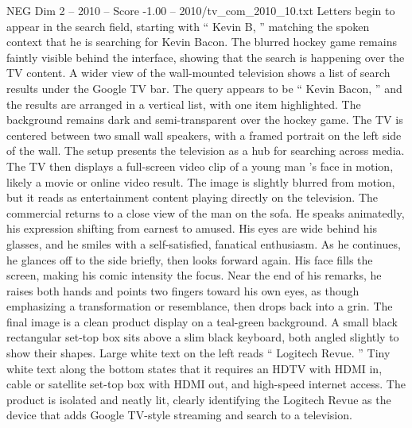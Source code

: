 \begin{textsample}{NEG Dim 2 – 2010 – Score -1.00 – 2010/tv\_com\_2010\_10.txt}
Letters begin to appear in the search field, starting with “ Kevin B, ” matching the spoken context that he is searching for Kevin Bacon.
The blurred hockey game remains faintly visible behind the interface, showing that the search is happening over the TV content.
A wider view of the wall-mounted television shows a list of search results under the Google TV bar.
The query appears to be “ Kevin Bacon, ” and the results are arranged in a vertical list, with one item highlighted.
The background remains dark and semi-transparent over the hockey game.
The TV is centered between two small wall speakers, with a framed portrait on the left side of the wall.
The setup presents the television as a hub for searching across media.
The TV then displays a full-screen video clip of a young man ’s face in motion, likely a movie or online video result.
The image is slightly blurred from motion, but it reads as entertainment content playing directly on the television.
The commercial returns to a close view of the man on the sofa.
He speaks animatedly, his expression shifting from earnest to amused.
His eyes are wide behind his glasses, and he smiles with a self-satisfied, fanatical enthusiasm.
As he continues, he glances off to the side briefly, then looks forward again.
His face fills the screen, making his comic intensity the focus.
Near the end of his remarks, he raises both hands and points two fingers toward his own eyes, as though emphasizing a transformation or resemblance, then drops back into a grin.
The final image is a clean product display on a teal-green background.
A small black rectangular set-top box sits above a slim black keyboard, both angled slightly to show their shapes.
Large white text on the left reads “ Logitech Revue. ” Tiny white text along the bottom states that it requires an HDTV with HDMI in, cable or satellite set-top box with HDMI out, and high-speed internet access.
The product is isolated and neatly lit, clearly identifying the Logitech Revue as the device that adds Google TV-style streaming and search to a television.

\end{textsample}
